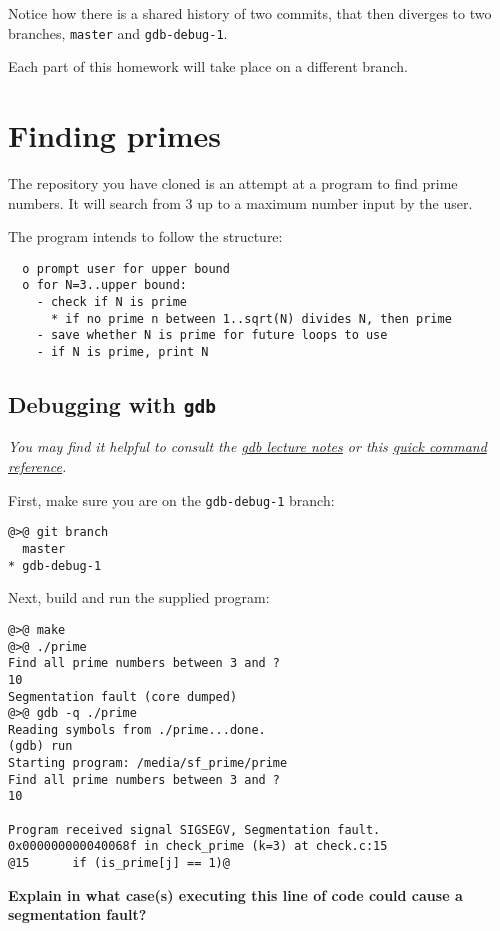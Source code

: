 \documentclass{article}
\begin{document}
Notice how there is a shared history of two commits, that then diverges to two
branches, \texttt{master} and \texttt{gdb-debug-1}.

Each part of this homework will take place on a different branch.

\section{Finding primes}

The repository you have cloned is an attempt at a program to find prime
numbers. It will search from 3 up to a maximum number input by the user.

The program intends to follow the structure:
\begin{lstlisting}
  o prompt user for upper bound
  o for N=3..upper bound:
    - check if N is prime
      * if no prime n between 1..sqrt(N) divides N, then prime
    - save whether N is prime for future loops to use
    - if N is prime, print N
\end{lstlisting}

\subsection{Debugging with \texttt{gdb}}

\emph{You may find it helpful to consult the
  \href{http://cse80.github.io/static/lecture/wk7-gdb.pdf}{gdb lecture notes}
  or this
  \href{https://ccrma.stanford.edu/~jos/stkintro/Useful_commands_gdb.html}
  {quick command reference}.
}



First, make sure you are on the \texttt{gdb-debug-1} branch:
\begin{lstlisting}
@>@ git branch
  master
* gdb-debug-1
\end{lstlisting}

Next, build and run the supplied program:
\begin{lstlisting}
@>@ make
@>@ ./prime
Find all prime numbers between 3 and ?
10
Segmentation fault (core dumped)
@>@ gdb -q ./prime
Reading symbols from ./prime...done.
(gdb) run
Starting program: /media/sf_prime/prime 
Find all prime numbers between 3 and ?
10

Program received signal SIGSEGV, Segmentation fault.
0x000000000040068f in check_prime (k=3) at check.c:15
@15      if (is_prime[j] == 1)@
\end{lstlisting}

\textbf{Explain in what case(s) executing this line of code could cause a
  segmentation fault?}
\vspace{3cm}
\end{document}
